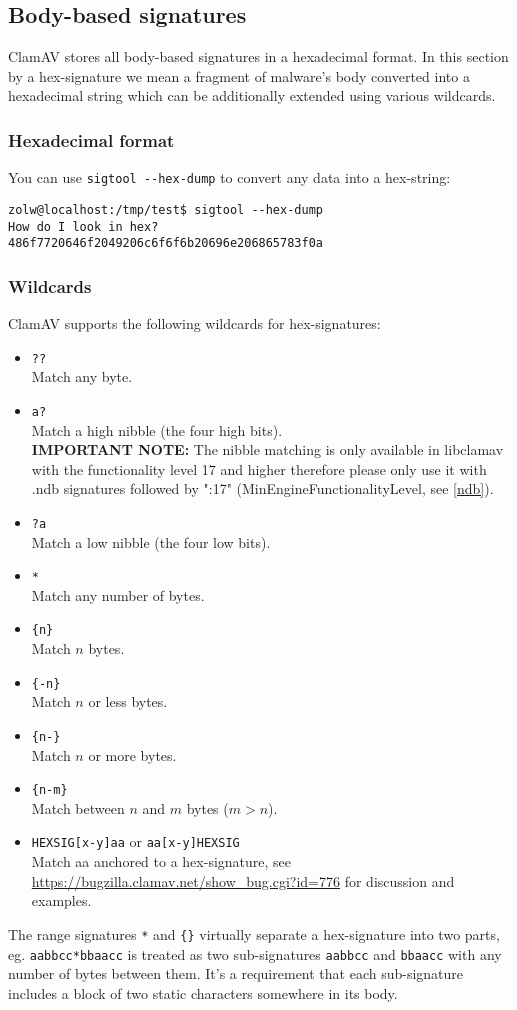 \documentclass[a4paper,titlepage,12pt]{article}
\begin{document}
    \subsection{Body-based signatures}
    ClamAV stores all body-based signatures in a hexadecimal format. In this
    section by a hex-signature we mean a fragment of malware's body converted
    into a hexadecimal string which can be additionally extended using various
    wildcards.

    \subsubsection{Hexadecimal format}
    You can use \verb+sigtool --hex-dump+ to convert any data into a hex-string:
    \begin{verbatim}
zolw@localhost:/tmp/test$ sigtool --hex-dump
How do I look in hex?
486f7720646f2049206c6f6f6b20696e206865783f0a
    \end{verbatim}

    \subsubsection{Wildcards}
    ClamAV supports the following wildcards for hex-signatures:
    \begin{itemize}
	\item \verb+??+\\
	Match any byte.
	\item \verb+a?+\\
	Match a high nibble (the four high bits).\\ \textbf{IMPORTANT NOTE:}
	The nibble matching is only available in libclamav with the
	functionality level 17 and higher therefore please only use it with
	.ndb signatures followed by ":17" (MinEngineFunctionalityLevel,
	see \ref{ndb}).
	\item \verb+?a+\\
	Match a low nibble (the four low bits).
	\item \verb+*+\\
	Match any number of bytes.
	\item \verb+{n}+\\
	Match $n$ bytes.
	\item \verb+{-n}+\\
	Match $n$ or less bytes.
	\item \verb+{n-}+\\
	Match $n$ or more bytes.
	\item \verb+{n-m}+\\
	Match between $n$ and $m$ bytes ($m > n$).
	\item \verb+HEXSIG[x-y]aa+ or \verb+aa[x-y]HEXSIG+\\
	Match aa anchored to a hex-signature, see
	\url{https://bugzilla.clamav.net/show_bug.cgi?id=776} for
	discussion and examples.
    \end{itemize}
    The range signatures \verb+*+ and \verb+{}+ virtually separate
    a hex-signature into two parts, eg. \verb+aabbcc*bbaacc+ is treated
    as two sub-signatures \verb+aabbcc+ and \verb+bbaacc+ with any number
    of bytes between them. It's a requirement that each sub-signature
    includes a block of two static characters somewhere in its body.
    
\end{document}
